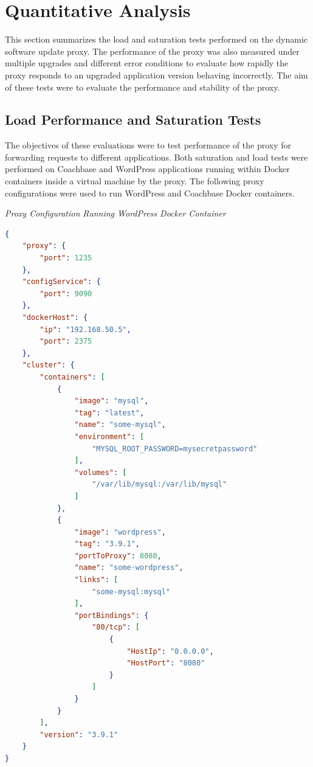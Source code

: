 \documentclass[a4paper,11pt,twoside]{report}
\begin{document}
\section{Quantitative Analysis}
This section summarizes the load and saturation tests performed on the dynamic software update proxy. The performance of the proxy was also measured under multiple upgrades and different error conditions to evaluate how rapidly the proxy responds to an upgraded application version behaving incorrectly. The aim of these tests were to evaluate the performance and stability of the proxy.

\subsection{Load Performance and Saturation Tests}\label{load} 
The objectives of these evaluations were to test performance of the proxy for forwarding requests to different applications. Both saturation and load tests were performed on Coachbase and WordPress applications running within Docker containers inside a virtual machine by the proxy. The following proxy configurations were used to run WordPress and Coachbase Docker containers.\medskip

\noindent
\textit{Proxy Configuration Running WordPress Docker Container}
\begin{lstlisting}[language=json]
{
    "proxy": {
        "port": 1235
    },
    "configService": {
        "port": 9090
    },
    "dockerHost": {
        "ip": "192.168.50.5",
        "port": 2375
    },
    "cluster": {
        "containers": [
            {
                "image": "mysql",
                "tag": "latest",
                "name": "some-mysql",
                "environment": [
                    "MYSQL_ROOT_PASSWORD=mysecretpassword"
                ],
                "volumes": [
                    "/var/lib/mysql:/var/lib/mysql"
                ]
            },
            {
                "image": "wordpress",
                "tag": "3.9.1",
                "portToProxy": 8080,
                "name": "some-wordpress",
                "links": [
                    "some-mysql:mysql"
                ],
                "portBindings": {
                    "80/tcp": [
                        {
                            "HostIp": "0.0.0.0",
                            "HostPort": "8080"
                        }
                    ]
                }
            }
        ],
        "version": "3.9.1"
    }
}
\end{lstlisting}  
\end{document}
